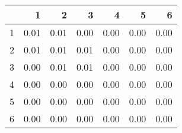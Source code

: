 \begin{table}[ht]
\begin{center}
\begin{tabular}{rrrrrrr}
  \hline
 & 1 & 2 & 3 & 4 & 5 & 6 \\ 
  \hline
1 & 0.01 & 0.01 & 0.00 & 0.00 & 0.00 & 0.00 \\ 
  2 & 0.01 & 0.01 & 0.01 & 0.00 & 0.00 & 0.00 \\ 
  3 & 0.00 & 0.01 & 0.01 & 0.00 & 0.00 & 0.00 \\ 
  4 & 0.00 & 0.00 & 0.00 & 0.00 & 0.00 & 0.00 \\ 
  5 & 0.00 & 0.00 & 0.00 & 0.00 & 0.00 & 0.00 \\ 
  6 & 0.00 & 0.00 & 0.00 & 0.00 & 0.00 & 0.00 \\ 
   \hline
\end{tabular}
\end{center}
\end{table}
